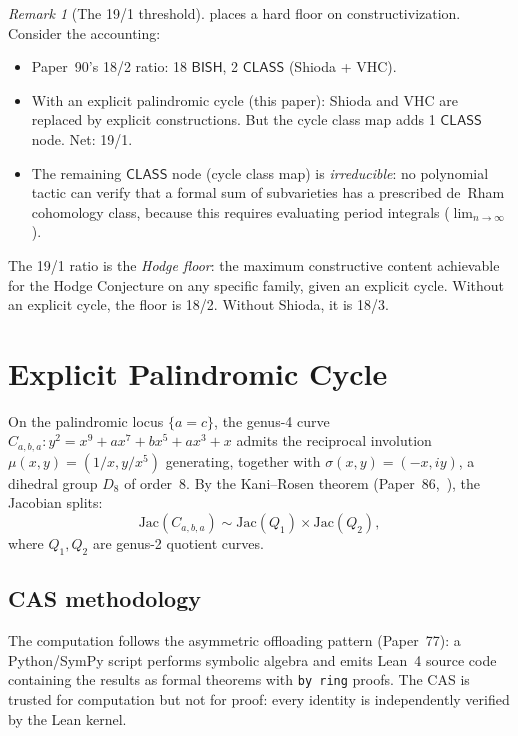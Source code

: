 \documentclass[11pt]{article}
\theoremstyle{plain}
\theoremstyle{definition}
\theoremstyle{remark}
\newtheorem{remark}[theorem]{Remark}
\newcommand{\Jac}{\mathrm{Jac}}
\newcommand{\BISH}{\mathsf{BISH}}
\newcommand{\CLASS}{\mathsf{CLASS}}
\begin{document}
\begin{remark}[The 19/1 threshold]
 places a hard floor on constructivization.  Consider
the accounting:
\begin{itemize}[nosep]
\item Paper~90's 18/2 ratio: 18 $\BISH$, 2 $\CLASS$ (Shioda + VHC).
\item With an explicit palindromic cycle (this paper): Shioda and VHC
  are replaced by explicit constructions.  But the cycle class map
  adds 1 $\CLASS$ node.  Net: 19/1.
\item The remaining $\CLASS$ node (cycle class map) is
  \emph{irreducible}: no polynomial tactic can verify that a
  formal sum of subvarieties has a prescribed de~Rham cohomology
  class, because this requires evaluating period integrals
  ($\lim_{n \to \infty}$).
\end{itemize}
The 19/1 ratio is the \emph{Hodge floor}: the maximum constructive
content achievable for the Hodge Conjecture on any specific family,
given an explicit cycle.  Without an explicit cycle, the floor is
18/2.  Without Shioda, it is 18/3.
\end{remark}

\section{Explicit Palindromic Cycle}\label{sec:cycle}

On the palindromic locus $\{a = c\}$, the genus-4 curve
$C_{a,b,a}: y^2 = x^9 + ax^7 + bx^5 + ax^3 + x$ admits the
reciprocal involution $\mu(x,y) = (1/x, y/x^5)$ generating, together
with $\sigma(x,y) = (-x, iy)$, a dihedral group $D_8$ of order~8.
By the Kani--Rosen theorem (Paper~86,~\cite{p86}), the Jacobian
splits:
\[
  \Jac(C_{a,b,a}) \sim \Jac(Q_1) \times \Jac(Q_2),
\]
where $Q_1, Q_2$ are genus-2 quotient curves.

\subsection{CAS methodology}

The computation follows the asymmetric offloading pattern
(Paper~77): a Python/SymPy script performs symbolic algebra and
emits Lean~4 source code containing the results as formal theorems
with \texttt{by ring} proofs.  The CAS is trusted for computation
but not for proof: every identity is independently verified by the
Lean kernel.
\end{document}
